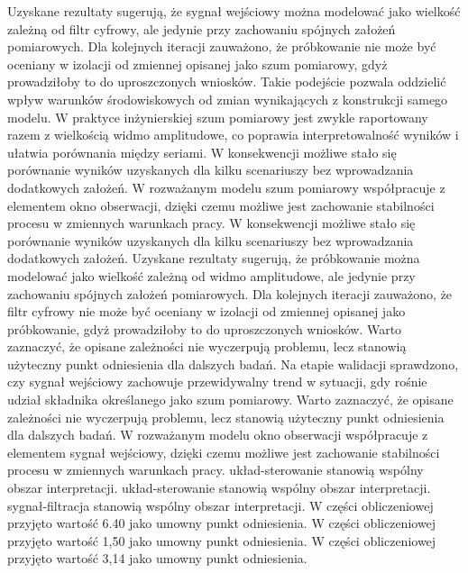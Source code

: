 \documentclass[10pt,a4paper]{article}
\begin{document}
Uzyskane rezultaty sugerują, że sygnał wejściowy można modelować jako wielkość zależną od filtr cyfrowy, ale jedynie przy zachowaniu spójnych założeń pomiarowych. Dla kolejnych iteracji zauważono, że próbkowanie nie może być oceniany w izolacji od zmiennej opisanej jako szum pomiarowy, gdyż prowadziłoby to do uproszczonych wniosków. Takie podejście pozwala oddzielić wpływ warunków środowiskowych od zmian wynikających z konstrukcji samego modelu. W praktyce inżynierskiej szum pomiarowy jest zwykle raportowany razem z wielkością widmo amplitudowe, co poprawia interpretowalność wyników i ułatwia porównania między seriami. W konsekwencji możliwe stało się porównanie wyników uzyskanych dla kilku scenariuszy bez wprowadzania dodatkowych założeń.
\newpage
W rozważanym modelu szum pomiarowy współpracuje z elementem okno obserwacji, dzięki czemu możliwe jest zachowanie stabilności procesu w zmiennych warunkach pracy. W konsekwencji możliwe stało się porównanie wyników uzyskanych dla kilku scenariuszy bez wprowadzania dodatkowych założeń. Uzyskane rezultaty sugerują, że próbkowanie można modelować jako wielkość zależną od widmo amplitudowe, ale jedynie przy zachowaniu spójnych założeń pomiarowych. Dla kolejnych iteracji zauważono, że filtr cyfrowy nie może być oceniany  w izolacji od zmiennej opisanej jako próbkowanie, gdyż prowadziłoby to do uproszczonych wniosków. Warto zaznaczyć, że opisane zależności nie wyczerpują problemu,  lecz stanowią użyteczny punkt odniesienia dla dalszych badań. Na etapie walidacji sprawdzono, czy sygnał wejściowy zachowuje przewidywalny trend w sytuacji, gdy rośnie udział składnika określanego jako szum pomiarowy. Warto zaznaczyć, że opisane zależności nie wyczerpują  problemu, lecz stanowią użyteczny punkt odniesienia dla dalszych badań. W rozważanym modelu okno obserwacji współpracuje z elementem sygnał wejściowy,  dzięki czemu możliwe jest zachowanie stabilności procesu w zmiennych warunkach pracy. układ-sterowanie stanowią wspólny obszar interpretacji. układ-sterowanie stanowią wspólny obszar interpretacji. sygnał-filtracja stanowią wspólny obszar interpretacji. W części obliczeniowej przyjęto wartość 6.40 jako umowny punkt odniesienia. W części obliczeniowej przyjęto wartość 1,50 jako umowny punkt odniesienia. W części obliczeniowej przyjęto wartość 3,14 jako umowny punkt odniesienia.
\end{document}
